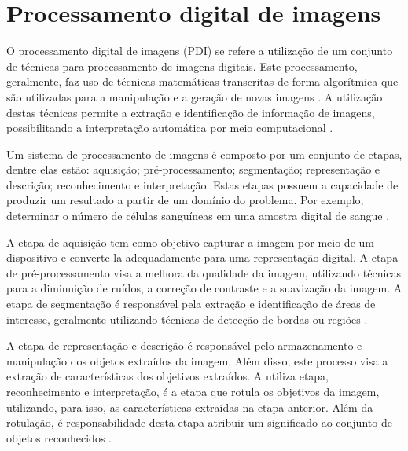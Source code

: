 \documentclass[
	12pt,				%
	oneside,			%
	a4paper,			%
	english,			%
	french,				%
	spanish,			%
	brazil,				%
	]{abntex2}
\begin{document}
\chapter{Processamento digital de imagens}

O  processamento digital de imagens (PDI) se refere a utilização de um conjunto de técnicas para processamento de imagens digitais. Este processamento, geralmente, faz uso de técnicas matemáticas transcritas de forma algorítmica que são utilizadas para a manipulação e a geração de novas imagens \cite{gonzalesWoods:2008}. A utilização destas técnicas permite a extração e identificação de informação de imagens, possibilitando a interpretação automática por meio computacional \cite{pedriniSchwartz:2008}.

Um sistema de processamento de imagens é composto por um conjunto de etapas, dentre elas estão: aquisição; pré-processamento; segmentação; representação e descrição; reconhecimento e interpretação. Estas etapas possuem a capacidade de produzir um resultado a partir de um domínio do problema. Por exemplo, determinar o número de células sanguíneas em uma amostra digital de sangue \cite{pedriniSchwartz:2008}.

A etapa de aquisição tem como objetivo capturar a imagem por meio de um dispositivo e converte-la adequadamente para uma representação digital. A etapa de pré-processamento visa a melhora da qualidade da imagem, utilizando técnicas para a diminuição de ruídos, a correção de contraste e a suavização da imagem. A etapa de segmentação é responsável pela extração e identificação de áreas de interesse, geralmente utilizando técnicas de detecção de bordas ou regiões \cite{pedriniSchwartz:2008}.

A etapa de representação e descrição é responsável  pelo armazenamento e manipulação dos objetos extraídos da imagem. Além disso, este processo visa a extração de características dos objetivos extraídos. A utiliza etapa, reconhecimento e interpretação, é a etapa que rotula os objetivos da imagem, utilizando, para isso, as características extraídas na etapa anterior. Além da rotulação, é responsabilidade desta etapa atribuir um significado ao conjunto de objetos reconhecidos \cite{pedriniSchwartz:2008}. 
% 
% 
% 
% 
\end{document}
